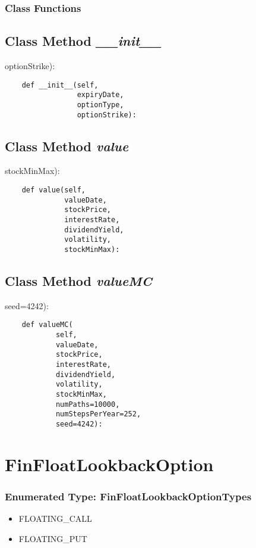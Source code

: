 \documentclass[twoside,11pt]{book}
\begin{document}
\subsubsection{Class Functions}

\subsection{Class Method {\it \_\_init\_\_}}
optionStrike):

\begin{lstlisting}
    def __init__(self,
                 expiryDate,
                 optionType,
                 optionStrike):
\end{lstlisting}

\subsection{Class Method {\it value}}
stockMinMax):

\begin{lstlisting}
    def value(self,
              valueDate,
              stockPrice,
              interestRate,
              dividendYield,
              volatility,
              stockMinMax):
\end{lstlisting}

\subsection{Class Method {\it valueMC}}
seed=4242):

\begin{lstlisting}
    def valueMC(
            self,
            valueDate,
            stockPrice,
            interestRate,
            dividendYield,
            volatility,
            stockMinMax,
            numPaths=10000,
            numStepsPerYear=252,
            seed=4242):
\end{lstlisting}

\newpage
\section{FinFloatLookbackOption}

\subsubsection{Enumerated Type: FinFloatLookbackOptionTypes}
\begin{itemize}
\item{FLOATING\_CALL}
\item{FLOATING\_PUT}
\end{itemize}
\end{document}
